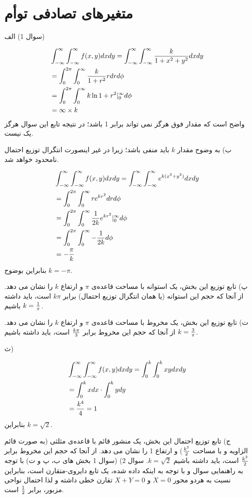 \documentclass[10pt,letterpaper]{report}
\newcommand{\eqn}[1]{
\[\begin{split}
#1
\end{split}\]
}
\begin{document}
\chapter{متغیرهای تصادفی توأم}

سوال 1) الف)
\eqn{
&\int_{-\infty}^{\infty}\int_{-\infty}^{\infty}f(x,y)dxdy=
\int_{-\infty}^{\infty}\int_{-\infty}^{\infty}{k\over 1+x^2+y^2}dxdy
\\&=
\int_{0}^{2\pi}\int_{0}^{\infty}{k\over 1+r^2}rdrd\phi
\\&=
\int_{0}^{2\pi}\int_{0}^{\infty}k\ln 1+r^2|_0^\infty d\phi
\\&=\infty\times k
}{}
واضح است که مقدار فوق هرگز نمی تواند برابر 1 باشد؛ در نتیجه تابع این سوال هرگز یک  نیست.

ب) به وضوح مقدار $k$ باید منفی باشد؛ زیرا در غیر اینصورت انتگرال توزیع احتمال نامحدود خواهد شد.
\eqn{
&\int_{-\infty}^{\infty}\int_{-\infty}^{\infty}f(x,y)dxdy=
\int_{-\infty}^{\infty}\int_{-\infty}^{\infty}e^{k(x^2+y^2)}dxdy
\\&=
\int_{0}^{2\pi}\int_{0}^{\infty}re^{kr^2}drd\phi
\\&=
\int_{0}^{2\pi}\int_{0}^{\infty}{1\over 2k}e^{kr^2}|_0^\infty d\phi
\\&=
\int_{0}^{2\pi}\int_{0}^{\infty}-{1\over 2k} d\phi
\\&=-{\pi\over k}
}{}
بنابراین بوضوح $k=-\pi$.

پ) تابع توزیع این بخش، یک استوانه با مساحت قاعده‌ی $\pi$ و ارتفاع $k$ را نشان می دهد. از آنجا که حجم این استوانه (یا همان انتگرال توزیع احتمال) برابر $k\pi$ است، باید داشته باشیم $k={1\over\pi}$.

ت) تابع توزیع این بخش، یک مخروط با مساحت قاعده‌ی $\pi$ و ارتفاع $k$ را نشان می دهد. از آنجا که حجم این مخروط برابر $k\pi\over 3$ است، باید داشته باشیم $k={3\over\pi}$.

ث) 
\eqn{
&\int_{-\infty}^{\infty}\int_{-\infty}^{\infty}f(x,y)dxdy=
\int_{0}^{k}\int_{0}^{k}xydxdy
\\&=
\int_{0}^{k}xdx\cdot \int_{0}^{k}ydy
\\&=
{k^4\over 4}
=1
}{}
بنابراین $k=\sqrt 2$.

ج) تابع توزیع احتمال این بخش، یک منشور قائم با قاعده‌ی مثلثی (به صورت قائم الزاویه و با مساحت $k^2\over 2$) و ارتفاع 1 را نشان می دهد. از آنجا که حجم این مخروط برابر $k^2\over 2$ است، باید داشته باشیم $k=\sqrt 2$.
\newline
\newline
سوال 2) (سوال 1 بخش های ب، پ و ت) با توجه به راهنمایی سوال و با توجه به اینکه  داده شده، یک تابع دایروی-متقارن است، بنابراین نسبت به هردو محور $X=0$ و $X+Y=0$ تقارن خطی داشته و لذا احتمال نواحی مزبور، برابر $1\over 2$ است.
\end{document}
